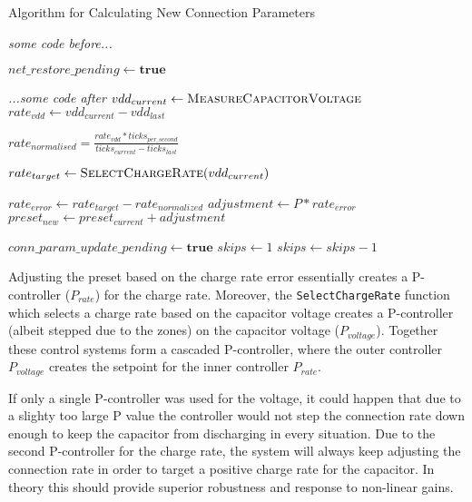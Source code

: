 \begin{algorithm}
    \caption{Algorithm for Calculating New Connection Parameters}
    \label{alg:conn_params_control_system}
    \begin{algorithmic}[1] 
            \State \textit{some code before...}

                \State {}
            \Else
                    \State $net\_restore\_pending \gets \textbf{true}$
                \Else
                    \State {}
                \EndIf
            \EndIf

            \State \textit{...some code after}
        \EndProcedure
            \State $vdd_{current} \gets \Call{MeasureCapacitorVoltage}{}$
            \State $rate_{vdd} \gets vdd_{current} - vdd_{last}$

                    \State $rate_{normalised} = \frac{rate_{vdd} * ticks_{per\_second}}{ticks_{current} - ticks_{last}}$

                    \State $rate_{target} \gets \Call{SelectChargeRate}{vdd_{current}}$

                    \State $rate_{error} \gets rate_{target} - rate_{normalized}$ 
                    \State $adjustment \gets P * rate_{error}$
                    \State $preset_{new} \gets preset_{current} + adjustment$

                        \State $conn\_param\_update\_pending \gets \textbf{true}$
                        \State $skips \gets 1$
                    \EndIf
                \Else
                    \State $skips \gets skips - 1$
                \EndIf
            \EndIf
        \EndProcedure
    \end{algorithmic}
\end{algorithm}

Adjusting the preset based on the charge rate error essentially creates a P-controller ($P_{rate}$) for the charge rate. Moreover, the \texttt{SelectChargeRate} function which selects a charge rate based on the capacitor voltage creates a P-controller (albeit stepped due to the zones) on the capacitor voltage ($P_{voltage}$). Together these control systems form a cascaded P-controller, where the outer controller $P_{voltage}$ creates the setpoint for the inner controller $P_{rate}$. 

If only a single P-controller was used for the voltage, it could happen that due to a slighty too large P value the controller would not step the connection rate down enough to keep the capacitor from discharging in every situation. Due to the second P-controller for the charge rate, the system will always keep adjusting the connection rate in order to target a positive charge rate for the capacitor. In theory this should provide superior robustness and response to non-linear gains.